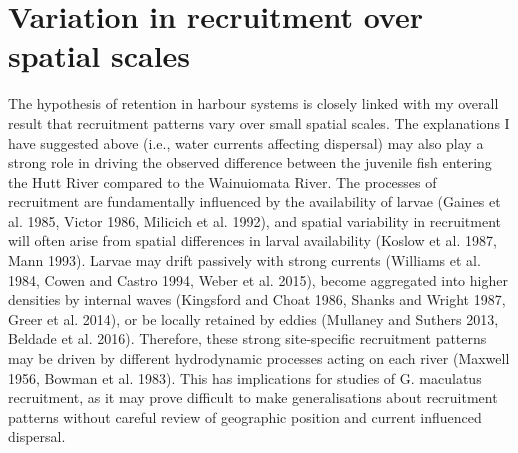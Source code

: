 \documentclass[]{book}
\begin{document}
\section{Variation in recruitment over spatial
scales}\label{variation-in-recruitment-over-spatial-scales}

The hypothesis of retention in harbour systems is closely linked with my
overall result that recruitment patterns vary over small spatial scales.
The explanations I have suggested above (i.e., water currents affecting
dispersal) may also play a strong role in driving the observed
difference between the juvenile fish entering the Hutt River compared to
the Wainuiomata River. The processes of recruitment are fundamentally
influenced by the availability of larvae (Gaines et al. 1985, Victor
1986, Milicich et al. 1992), and spatial variability in recruitment will
often arise from spatial differences in larval availability (Koslow et
al. 1987, Mann 1993). Larvae may drift passively with strong currents
(Williams et al. 1984, Cowen and Castro 1994, Weber et al. 2015), become
aggregated into higher densities by internal waves (Kingsford and Choat
1986, Shanks and Wright 1987, Greer et al. 2014), or be locally retained
by eddies (Mullaney and Suthers 2013, Beldade et al. 2016). Therefore,
these strong site-specific recruitment patterns may be driven by
different hydrodynamic processes acting on each river (Maxwell 1956,
Bowman et al. 1983). This has implications for studies of G. maculatus
recruitment, as it may prove difficult to make generalisations about
recruitment patterns without careful review of geographic position and
current influenced dispersal.
\end{document}
